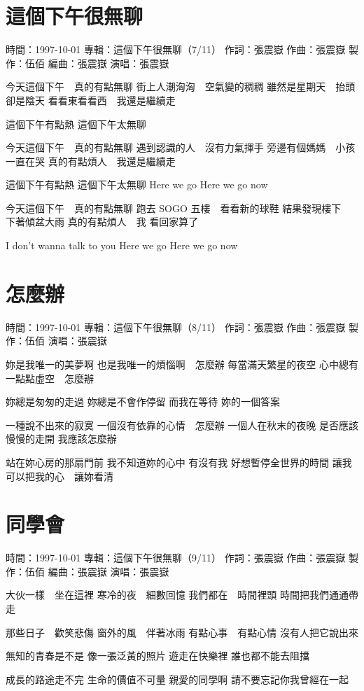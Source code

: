 \documentclass[UTF8,a4paper,oneside,twocolumn,12pt]{ctexbook}
\newcommand{\infopair}[2]{\textbullet #1：#2}
\newcommand{\zc}[1][伍佰]{\infopair{作詞}{#1}}
\newcommand{\zq}[1][伍佰]{\infopair{作曲}{#1}}
\newcommand{\bq}[1][伍佰]{\infopair{編曲}{#1}}
\newcommand{\zj}[1]{\infopair{專輯}{#1}}
\newcommand{\zz}[1]{\infopair{製作}{#1}}
\newcommand{\sj}[1]{\infopair{時間}{#1}}
\newenvironment{info}{\begin{flushleft}\kaishu
	}
	{\end{flushleft}\normalsize\yahei\par}
\newenvironment{lyric}{
	}
{}
\begin{document}
\section{這個下午很無聊}
\begin{info}
	\sj{1997-10-01}
	\zj{這個下午很無聊（7/11）}
	\zc[張震嶽]
	\zq[張震嶽]
	\zz{伍佰}
	\bq[張震嶽]
	\infopair{演唱}{張震嶽}
\end{info}
\begin{lyric}
	今天這個下午　真的有點無聊
	街上人潮洶洶　空氣變的稠稠
	雖然是星期天　抬頭卻是陰天
	看看東看看西　我還是繼續走

	這個下午有點熱 這個下午太無聊

	今天這個下午　真的有點無聊
	遇到認識的人　沒有力氣揮手
	旁邊有個媽媽　小孩一直在哭
	真的有點煩人　我還是繼續走

	這個下午有點熱 這個下午太無聊
	Here we go Here we go now

	今天這個下午　真的有點無聊
	跑去 SOGO 五樓　看看新的球鞋
	結果發現樓下　下著傾盆大雨
	真的有點煩人　我 看回家算了

	I don't wanna talk to you
	Here we go Here we go now
\end{lyric}

\section{怎麼辦}
\begin{info}
	\sj{1997-10-01}
	\zj{這個下午很無聊（8/11）}
	\zc[張震嶽]
	\zq[張震嶽]
	\zz{伍佰}
	\infopair{演唱}{張震嶽}
\end{info}
\begin{lyric}
	妳是我唯一的美夢啊
	也是我唯一的煩惱啊　怎麼辦
	每當滿天繁星的夜空
	心中總有一點點虛空　怎麼辦

	妳總是匆匆的走過
	妳總是不會作停留
	而我在等待
	妳的一個答案

	一種說不出來的寂寞
	一個沒有依靠的心情　怎麼辦
	一個人在秋末的夜晚
	是否應該慢慢的走開
	我應該怎麼辦

	站在妳心房的那扇門前
	我不知道妳的心中 有沒有我
	好想暫停全世界的時間
	讓我可以把我的心　讓妳看清
\end{lyric}

\section{同學會}
\begin{info}
	\sj{1997-10-01}
	\zj{這個下午很無聊（9/11）}
	\zc[張震嶽]
	\zq[張震嶽]
	\zz{伍佰}
	\bq[張震嶽]
	\infopair{演唱}{張震嶽}
\end{info}
\begin{lyric}
	大伙一樣　坐在這裡
	寒冷的夜　細數回憶
	我們都在　時間裡頭
	時間把我們通通帶走

	那些日子　歡笑悲傷
	窗外的風　伴著冰雨
	有點心事　有點心情
	沒有人把它說出來

	無知的青春是不是
	像一張泛黃的照片
	遊走在快樂裡
	誰也都不能去阻擋

	成長的路途走不完
	生命的價值不可量
	親愛的同學啊
	請不要忘記你我曾經在一起
\end{lyric}
\end{document}
